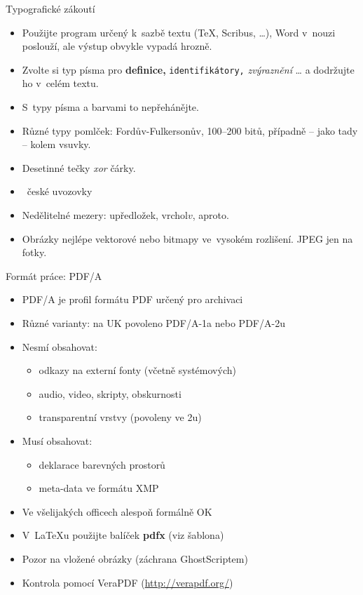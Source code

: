 \documentclass{beamer}
\begin{document}
\begin{frame}{Typografické zákoutí}

\begin{itemize}
\item Použijte program určený k~sazbě textu (\TeX, Scribus, \dots),
   Word v~nouzi poslouží, ale výstup obvykle vypadá hrozně.
\item Zvolte si typ písma pro {\bf definice,} {\tt identifikátory,} {\it zvýraznění\/} \dots{} a
   dodržujte ho v~celém textu.
\item S~typy písma a barvami to nepřehánějte.
\item Různé typy pomlček: Fordův-Fulkersonův, 100--200 bitů, případně -- jako tady -- kolem vsuvky.
\item Desetinné tečky {\it xor\/} čárky.
\item \clqq~české uvozovky \crqq
\item Nedělitelné mezery: u{\tt{}}předložek, vrchol{\tt{}}$v$, a{\tt{}}proto.
\item Obrázky nejlépe vektorové nebo bitmapy ve~vysokém rozlišení. JPEG jen na fotky.
\end{itemize}

\end{frame}

\begin{frame}{Formát práce: PDF/A}

\begin{itemize}
\item PDF/A je profil formátu PDF určený pro archivaci
\item Různé varianty: na UK povoleno PDF/A-1a nebo PDF/A-2u
\item Nesmí obsahovat:
	\begin{itemize}
	\item odkazy na externí fonty (včetně systémových)
	\item audio, video, skripty, obskurnosti
	\item transparentní vrstvy (povoleny ve 2u)
	\end{itemize}
\item Musí obsahovat:
	\begin{itemize}
	\item deklarace barevných prostorů
	\item meta-data ve formátu XMP
	\end{itemize}
\item Ve všelijakých officech alespoň formálně OK
\item V~\LaTeX{}u použijte balíček {\bf pdfx} (viz šablona)
\item Pozor na vložené obrázky (záchrana GhostScriptem)
\item Kontrola pomocí VeraPDF (\url{http://verapdf.org/})
\end{itemize}

\end{frame}
\end{document}
